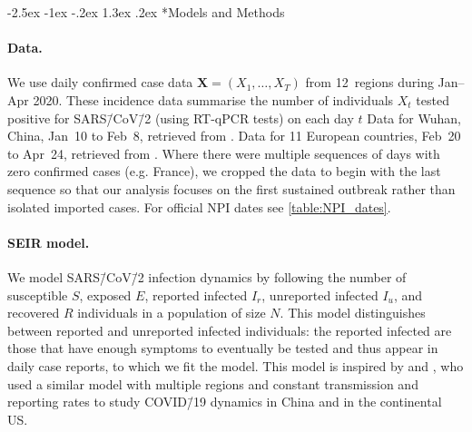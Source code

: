 \documentclass[12pt]{extarticle}
\makeatletter
\renewcommand\section{\@startsection {section}{1}{\z@}%
     {-2.5ex \@plus -1ex \@minus -.2ex}%
     {1.3ex \@plus.2ex}%
    {\Large\bfseries}}
\newcommand{\covid}{COVID\=/19 }
\newcommand{\sars}{SARS\=/CoV\=/2 }
\let\vec\mathbf
\makeatother
\begin{document}
{\small
\section*{Models and Methods}



\paragraph*{Data.} 
We use daily confirmed case data $\vec{X}=(X_1, \ldots, X_T)$ from 12~regions during Jan--Apr 2020. These incidence data summarise the number of individuals $X_t$ tested positive for \sars (using RT-qPCR tests) on each day $t$ 
Data for Wuhan, China, Jan~10 to Feb~8, retrieved from \citet{Pei2020}. Data for 11 European countries, Feb~20 to Apr~24, retrieved from \citet{Flaxman2020}.
Where there were multiple sequences of days with zero confirmed cases (e.g. France), we cropped the data to begin with the last sequence so that our analysis focuses on the first sustained outbreak rather than isolated imported cases. 
For official NPI dates see \autoref{table:NPI_dates}.



\paragraph*{SEIR model.} \label{sec:model}
We model \sars infection dynamics by following the number of susceptible $S$, exposed $E$, reported infected $I_r$, unreported infected $I_u$, and recovered $R$ individuals in a population of size $N$.
This model distinguishes between reported and unreported infected individuals: the reported infected are those that have enough symptoms to eventually be tested and thus appear in daily case reports, to which we fit the model.
This model is inspired by \citet{Li2020} and \citet{Pei2020}, who used a similar model with multiple regions and constant transmission and reporting rates to study \covid dynamics in China and in the continental US.

}
\end{document}
